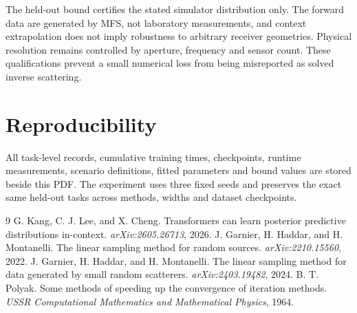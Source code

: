 \documentclass[10pt]{article}
\begin{document}
The held-out bound certifies the stated simulator distribution only.  The
forward data are generated by MFS, not laboratory measurements, and context
extrapolation does not imply robustness to arbitrary receiver geometries.
Physical resolution remains controlled by aperture, frequency and sensor
count.  These qualifications prevent a small numerical loss from being
misreported as solved inverse scattering.

\section{Reproducibility}
All task-level records, cumulative training times, checkpoints, runtime
measurements, scenario definitions, fitted parameters and bound values are
stored beside this PDF.  The experiment uses three fixed seeds and preserves
the exact same held-out tasks across methods, widths and dataset checkpoints.

\begin{thebibliography}{9}
 G. Kang, C. J. Lee, and X. Cheng.
Transformers can learn posterior predictive distributions in-context.
\emph{arXiv:2605.26713}, 2026.
 J. Garnier, H. Haddar, and H. Montanelli.
The linear sampling method for random sources. \emph{arXiv:2210.15560}, 2022.
 J. Garnier, H. Haddar, and H. Montanelli.
The linear sampling method for data generated by small random scatterers.
\emph{arXiv:2403.19482}, 2024.
 B. T. Polyak. Some methods of speeding up the convergence
of iteration methods. \emph{USSR Computational Mathematics and Mathematical
Physics}, 1964.
\end{thebibliography}
\end{document}
